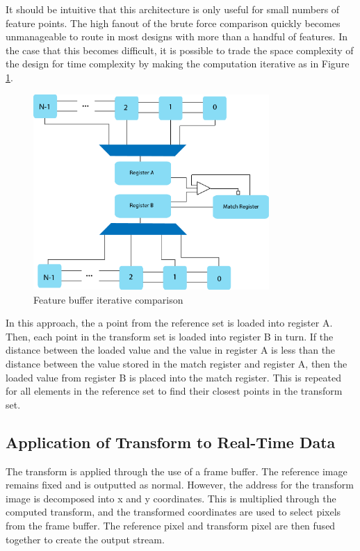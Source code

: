 \documentclass[sigconf]{acmart/acmart}
\begin{document}
It should be intuitive that this architecture is only useful for small numbers of feature points. The high fanout of the brute force comparison quickly becomes unmanageable to route in most designs with more than a handful of features. In the case that this becomes difficult, it is possible to trade the space complexity of the design for time complexity by making the computation iterative as in Figure \ref{fig_comparison_iter}.

\begin{figure}[h]
	\centering
	\includegraphics[width=0.8\textwidth]{figures/block/comparison_iter}
	\caption{Feature buffer iterative comparison}
	\label{fig_comparison_iter}
\end{figure}

In this approach, the a point from the reference set is loaded into register A. Then, each point in the transform set is loaded into register B in turn. If the distance between the loaded value and the value in register A is less than the distance between the value stored in the match register and register A, then the loaded value from register B is placed into the match register. This is repeated for all elements in the reference set to find their closest points in the transform set.

\subsection{Application of Transform to Real-Time Data}

The transform is applied through the use of a frame buffer. The reference image remains fixed and is outputted as normal. However, the address for the transform image is decomposed into x and y coordinates. This is multiplied through the computed transform, and the transformed coordinates are used to select pixels from the frame buffer. The reference pixel and transform pixel are then fused together to create the output stream.
\end{document}
